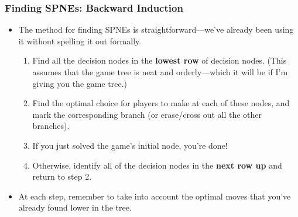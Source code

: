 \begin{frame}
\frametitle{Finding SPNEs: Backward Induction}
\begin{itemize}
\item The method for finding SPNEs is straightforward---we've already been using it without spelling it out formally.
	\begin{enumerate}
	\item Find all the decision nodes in the \textbf{lowest row} of decision nodes. (This assumes that the game tree is neat and orderly---which it will be if I'm giving you the game tree.)
	\item Find the optimal choice for players to make at each of these nodes, and mark the corresponding branch (or erase/cross out all the other branches).
	\item If you just solved the game's initial node, you're done! 
	\item Otherwise, identify all of the decision nodes in the \textbf{next row up} and return to step 2.
	\end{enumerate}
	\item At each step, remember to take into account the optimal moves that you've already found lower in the tree.
\end{itemize}
\end{frame}
